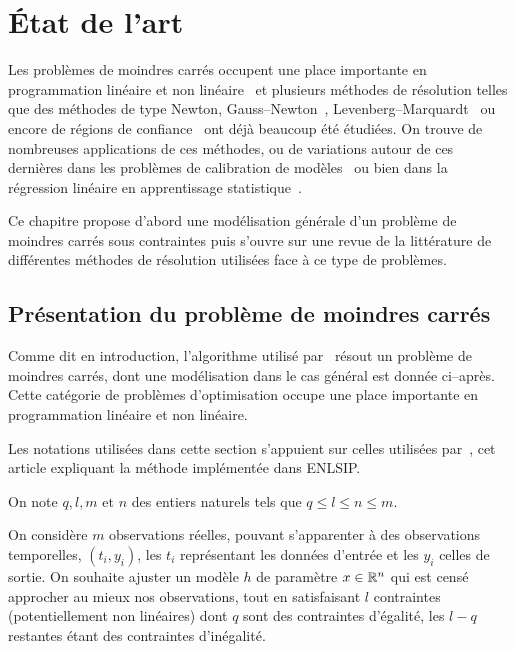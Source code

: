 \chapter{\'Etat de l'art}\label{edart}


Les problèmes de moindres carrés occupent une place importante en programmation linéaire et non linéaire~\cite{schitt88,hansonkrogh92, dennschn96, nocewrig99} et 
plusieurs méthodes de résolution telles que des méthodes de type Newton, Gauss--Newton~\cite{lindstromwedin1984}, Levenberg--Marquardt~\cite{jjmore78} ou encore 
de régions de confiance~\cite{conngoultoin00} ont déjà beaucoup été étudiées. On trouve de nombreuses applications de ces méthodes, ou de variations autour de ces 
dernières dans les problèmes de calibration de modèles~\cite{johnson08} ou bien dans la régression linéaire en apprentissage 
statistique~\cite{eslii09, audicatoni11}.

Ce chapitre propose d'abord une modélisation générale d'un problème de moindres carrés sous contraintes puis s'ouvre sur une revue de la littérature de 
différentes méthodes de résolution utilisées face à ce type de problèmes.

\section{Présentation du problème de moindres carrés}\label{model_mc}

Comme dit en introduction, l'algorithme utilisé par \HQ\ résout un problème de moindres carrés, dont une modélisation dans le cas général est donnée ci--après. 
Cette catégorie de problèmes d'optimisation occupe une place importante en programmation linéaire et non linéaire.

Les notations utilisées dans cette section s'appuient sur celles utilisées par~\citet{lindwedin88}, cet article expliquant la méthode implémentée dans ENLSIP.

On note $q,l,m\text{ et }n$  des entiers naturels tels que $q \leq l \leq n \leq m$. 

On considère $m$ observations réelles, pouvant s'apparenter à des observations temporelles, $(t_{i},y_{i})$, les $t_i$ représentant les données d'entrée et 
les $y_i$ celles de sortie. On souhaite ajuster un modèle $h$ de paramètre $x\in \mathbb{R}^{n}$ qui est censé approcher au mieux nos observations, 
tout en satisfaisant $l$ contraintes (potentiellement non linéaires) dont $q$ sont des contraintes d'égalité, les $l-q$ restantes étant des contraintes 
d'inégalité.

